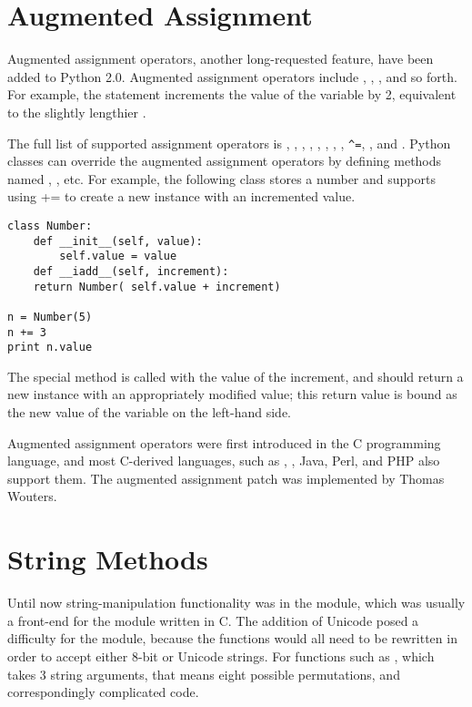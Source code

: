 \documentclass{howto}
\begin{document}
\section{Augmented Assignment}

Augmented assignment operators, another long-requested feature, have
been added to Python 2.0.  Augmented assignment operators include
\code{+=}, \code{-=}, \code{*=}, and so forth.  For example, the
statement  increments the value of the variable 
 by 2, equivalent to the slightly lengthier .

The full list of supported assignment operators is \code{+=},
\code{-=}, \code{*=}, \code{/=}, \code{\%=}, \code{**=}, \code{\&=},
\code{|=}, \verb|^=|, \code{>{}>=}, and \code{<{}<=}.  Python classes can
override the augmented assignment operators by defining methods named
, , etc.  For example, the following
 class stores a number and supports using += to create a
new instance with an incremented value.

\begin{verbatim}
class Number:
    def __init__(self, value):
        self.value = value
    def __iadd__(self, increment):
	return Number( self.value + increment)

n = Number(5)
n += 3
print n.value
\end{verbatim}

The  special method is called with the value of the
increment, and should return a new instance with an appropriately
modified value; this return value is bound as the new value of the
variable on the left-hand side. 

Augmented assignment operators were first introduced in the C
programming language, and most C-derived languages, such as
, \Cpp, Java, Perl, and PHP also support them.  The augmented
assignment patch was implemented by Thomas Wouters.

\section{String Methods}

Until now string-manipulation functionality was in the 
module, which was usually a front-end for the 
module written in C.  The addition of Unicode posed a difficulty for
the  module, because the functions would all need to be
rewritten in order to accept either 8-bit or Unicode strings.  For
functions such as , which takes 3 string
arguments, that means eight possible permutations, and correspondingly
complicated code.
\end{document}
